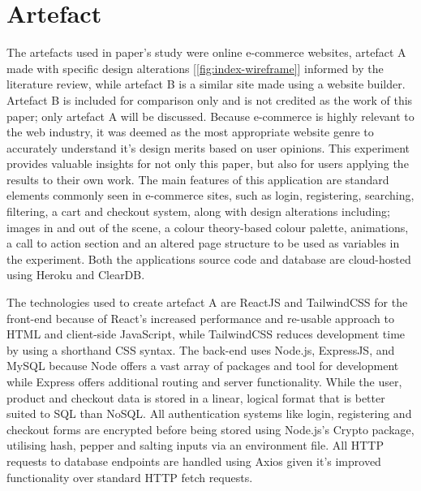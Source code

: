 \documentclass[article]{IEEEtran}
\begin{document}
    \section{Artefact}
        The artefacts used in paper's study were online e-commerce websites, artefact A made with specific design alterations [\autoref{fig:index-wireframe}] informed by the literature review, while artefact B is a similar site made using a website builder. Artefact B is included for comparison only and is not credited as the work of this paper; only artefact A will be discussed. Because e-commerce is highly relevant to the web industry, it was deemed as the most appropriate website genre to accurately understand it's design merits based on user opinions. This experiment provides valuable insights for not only this paper, but also for users applying the results to their own work. The main features of this application are standard elements commonly seen in e-commerce sites, such as login, registering, searching, filtering, a cart and checkout system, along with design alterations including; images in and out of the scene, a colour theory-based colour palette, animations, a call to action section and an altered page structure to be used as variables in the experiment. Both the applications source code and database are cloud-hosted using Heroku and ClearDB.

        The technologies used to create artefact A are ReactJS and TailwindCSS for the front-end because of React's increased performance and re-usable approach to HTML and client-side JavaScript, while TailwindCSS reduces development time by using a shorthand CSS syntax. The back-end uses Node.js, ExpressJS, and MySQL because Node offers a vast array of packages and tool for development while Express offers additional routing and server functionality. While the user, product and checkout data is stored in a linear, logical format that is better suited to SQL than NoSQL. All authentication systems like login, registering and checkout forms are encrypted before being stored using Node.js's Crypto package, utilising hash, pepper and salting inputs via an environment file. All HTTP requests to database endpoints are handled using Axios given it's improved functionality over standard HTTP fetch requests.
\end{document}
